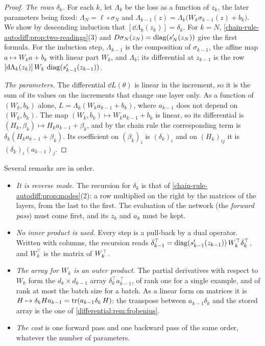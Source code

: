 \begin{notechapter}
\begin{proof}
\emph{The rows $\delta_k$.} For each $k$, let $\Lambda_k$ be the loss as a
function of $z_k$, the later parameters being fixed:
$\Lambda_N = \ell\circ\sigma_N$ and
$\Lambda_{k-1}(z) = \Lambda_k\bigl(W_k\sigma_{k-1}(z) + b_k\bigr)$. We show
by descending induction that $[\dd\Lambda_k(z_k)] = \delta_k$. For
$k = N$, \cref{chain-rule-autodiff:prop:two-readings}(3) and
$D\sigma_N(z_N) = \operatorname{diag}(s_N'(z_N))$ give the first formula. For the
induction step, $\Lambda_{k-1}$ is the composition of $\sigma_{k-1}$, the
affine map $a\mapsto W_ka + b_k$ with linear part $W_k$, and $\Lambda_k$;
its differential at $z_{k-1}$ is the row
$[\mathrm{d}\Lambda_k(z_k)]\,W_k\,\operatorname{diag}(s_{k-1}'(z_{k-1}))$.

\emph{The parameters.} The differential $\dd L(\theta)$ is linear in the
increment, so it is the sum of its values on the increments that change
one layer only. As a function of $(W_k, b_k)$ alone,
$L = \Lambda_k(W_ka_{k-1} + b_k)$, where $a_{k-1}$ does not depend on
$(W_k, b_k)$. The map $(W_k, b_k)\mapsto W_ka_{k-1} + b_k$ is linear, so
its differential is $(H_k, \beta_k)\mapsto H_ka_{k-1} + \beta_k$, and by
the chain rule the corresponding term is
$\delta_k(H_ka_{k-1} + \beta_k)$. Its coefficient on $(\beta_k)_i$ is
$(\delta_k)_i$ and on $(H_k)_{ij}$ it is $(\delta_k)_i(a_{k-1})_j$.
\end{proof}

Several remarks are in order.
\begin{itemize}[nosep]
  \item \emph{It is reverse mode.} The recursion for $\delta_k$ is that
        of \cref{chain-rule-autodiff:prop:modes}(2): a row multiplied on
        the right by the matrices of the layers, from the last to the
        first. The evaluation of the network (the \emph{forward pass})
        must come first, and its $z_k$ and $a_k$ must be kept.
  \item \emph{No inner product is used.} Every step is a pull-back by a
        dual operator. Written with columns, the recursion reads
        $\delta_{k-1}^\top
        = \operatorname{diag}(s_{k-1}'(z_{k-1}))\,W_k^\top\delta_k^\top$,
        and $W_k^\top$ is the matrix of $W_k^{\top}$.
  \item \emph{The array for $W_k$ is an outer product.} The partial
        derivatives with respect to $W_k$ form the $d_k\times d_{k-1}$
        array $\delta_k^\top a_{k-1}^\top$, of rank one for a single
        example, and of rank at most the batch size for a batch. As a
        linear form on matrices it is
        $H\mapsto\delta_kHa_{k-1} = \operatorname{tr}(a_{k-1}\delta_k\,H)$: the
        transpose between $a_{k-1}\delta_k$ and the stored array is the
        one of \cref{differential:rem:frobenius}.
  \item \emph{The cost} is one forward pass and one backward pass of the
        same order, whatever the number of parameters.
\end{itemize}


\end{notechapter}
